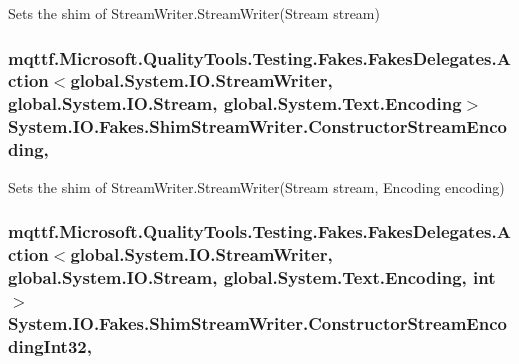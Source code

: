 Sets the shim of Stream\-Writer.\-Stream\-Writer(\-Stream stream)

\hypertarget{class_system_1_1_i_o_1_1_fakes_1_1_shim_stream_writer_a325ab764e9e10584cb92052601adc345}{
\subsubsection[{Constructor\-Stream\-Encoding}]{\setlength{\rightskip}{0pt plus 5cm}mqttf.\-Microsoft.\-Quality\-Tools.\-Testing.\-Fakes.\-Fakes\-Delegates.\-Action$<$global.\-System.\-I\-O.\-Stream\-Writer, global.\-System.\-I\-O.\-Stream, global.\-System.\-Text.\-Encoding$>$ System.\-I\-O.\-Fakes.\-Shim\-Stream\-Writer.\-Constructor\-Stream\-Encoding\hspace{0.3cm}{\ttfamily [static]}, {\ttfamily [set]}}}\label{class_system_1_1_i_o_1_1_fakes_1_1_shim_stream_writer_a325ab764e9e10584cb92052601adc345}


Sets the shim of Stream\-Writer.\-Stream\-Writer(\-Stream stream, Encoding encoding)

\hypertarget{class_system_1_1_i_o_1_1_fakes_1_1_shim_stream_writer_aabda7a399c6959af3f373cafa0205a21}{
\subsubsection[{Constructor\-Stream\-Encoding\-Int32}]{\setlength{\rightskip}{0pt plus 5cm}mqttf.\-Microsoft.\-Quality\-Tools.\-Testing.\-Fakes.\-Fakes\-Delegates.\-Action$<$global.\-System.\-I\-O.\-Stream\-Writer, global.\-System.\-I\-O.\-Stream, global.\-System.\-Text.\-Encoding, int$>$ System.\-I\-O.\-Fakes.\-Shim\-Stream\-Writer.\-Constructor\-Stream\-Encoding\-Int32\hspace{0.3cm}{\ttfamily [static]}, {\ttfamily [set]}}}\label{class_system_1_1_i_o_1_1_fakes_1_1_shim_stream_writer_aabda7a399c6959af3f373cafa0205a21}



